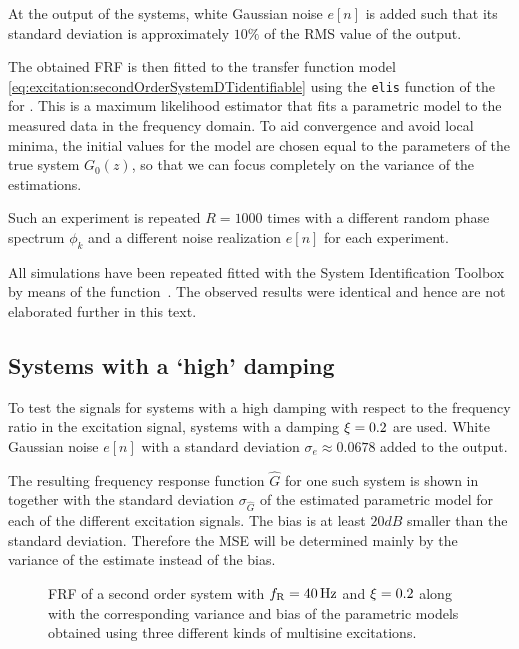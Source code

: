   At the output of the systems, white Gaussian noise $e[n]$ is added such that its standard deviation is approximately $10\%$ of the RMS value of the output.

  
  The obtained FRF is then fitted to the transfer function model \eqref{eq:excitation:secondOrderSystemDTidentifiable} using the \texttt{elis} function of the \FDIDENT~\citep{FDIDENT} for \MATLAB.
  This is a maximum likelihood estimator that fits a parametric model to the measured data in the frequency domain.
  To aid convergence and avoid local minima, the initial values for the model are chosen equal to the parameters of the true system $G_0(z)$, so that we can focus completely on the variance of the estimations.

  Such an experiment is repeated $R=1000$ times with a different random phase  spectrum $\phi_k$ and a different noise realization $e[n]$ for each experiment.

  \begin{remark}
  All simulations  have been repeated fitted with the \MATLAB System Identification Toolbox by means of the  function~\citep{TDIDENT}.
  The observed results were identical and hence are not elaborated further in this text.
  \end{remark}

  \subsection{Systems with a `high' damping}
  To test the signals for systems with a high damping with respect to the frequency ratio in the excitation signal, systems with a damping $\xi = 0.2$ are used.
  White Gaussian noise $e[n]$ with a standard deviation $\sigma_e \approx 0.0678$ added to the output.

  The resulting frequency response function $\hat{G}$ for one such system is shown in  together with the standard deviation $\sigma_{\hat{G}}$ of the estimated parametric model for each of the different excitation signals.
  The bias is at least $20\unit{dB}$ smaller than the standard  deviation.
  Therefore the \gls{MSE} will be determined mainly by the variance of the estimate instead of the bias.

  \begin{figure}[th]
    \centering
    \setlength\figureheight{5cm}
    \setlength{}
    
    \caption[Simulated FRF and its variance for different excitation signals.]{FRF of a second order system with $f_{\mathrm{R}}=40\,\mathrm{Hz}$ and $\xi=0.2$
             along with the corresponding variance and bias of the parametric models obtained using three different kinds of multisine excitations.}%
    \label{fig:FRF1}
  \end{figure}

